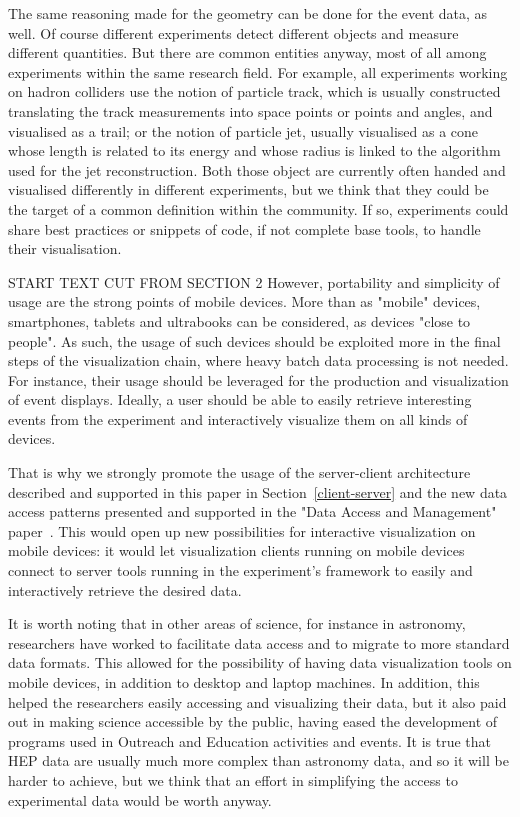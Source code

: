 \documentclass[12pt,a4paper]{article}
\begin{document}
The same reasoning made for the geometry can be done for the event data, as well. Of course different experiments detect
different objects and measure different quantities. But there are common entities anyway, most of all among experiments
within the same research field. For example, all experiments working on hadron colliders use the notion of particle track,
which is usually constructed translating the track measurements into space points or points and angles, and visualised as
a trail; or the notion of particle jet, usually visualised as a cone whose length is related to its energy and whose radius
is linked to the algorithm used for the jet reconstruction. Both those object are currently often handed and visualised
differently in different experiments, but we think that they could be the target of a common definition within the community.
If so, experiments could share best practices or snippets of code, if not complete base tools, to handle their visualisation.

START TEXT CUT FROM SECTION 2
However, portability and simplicity of usage are the strong points of mobile devices. More than as "mobile" devices, smartphones,
tablets and ultrabooks can be considered, as devices "close to people". As such, the usage of such devices
should be exploited more in the final steps of the visualization chain, where heavy batch data processing is not needed. For instance,
their usage should be leveraged for the production and visualization of event displays.
Ideally, a user should be able to easily retrieve interesting events from the experiment and interactively visualize them on all
kinds of devices.

That is why we strongly promote the usage of the server-client architecture described and supported in this paper in Section~\ref{client-server}
and the new data access patterns presented and supported in the "Data Access and Management" paper~\cite{hsf-cwp-data}. This would open
up new possibilities for interactive visualization on mobile devices: it would let visualization clients running on mobile devices
connect to server tools running in the experiment's framework to easily and interactively retrieve the desired data.

It is worth noting that in other areas of science, for instance in astronomy, researchers have worked to facilitate data
access and to migrate to more standard data formats. This allowed for the possibility of having data visualization tools
on mobile devices, in addition to desktop and laptop machines. In addition, this helped the researchers easily accessing and visualizing
their data, but it also paid out in making science accessible by the public, having eased the development of programs used in
Outreach and Education activities and events. It is true that HEP data are usually much more complex than astronomy data, and so it
will be harder to achieve, but we think that an effort in simplifying the access to experimental data would be worth anyway.
\end{document}

